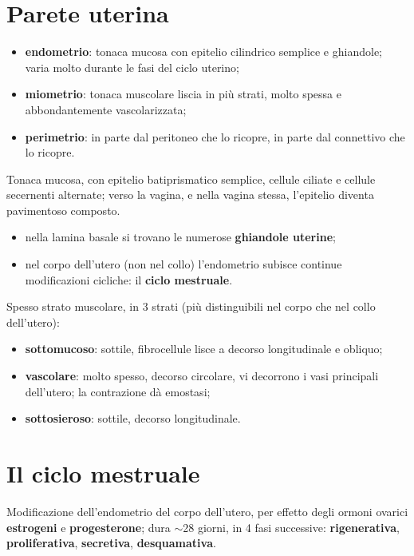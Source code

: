 \section{Parete uterina}

\begin{itemize}
  \item \textbf{endometrio}: tonaca mucosa con epitelio cilindrico semplice e ghiandole; varia
    molto durante le fasi del ciclo uterino;
  \item \textbf{miometrio}: tonaca muscolare liscia in più strati, molto spessa e abbondantemente
    vascolarizzata;
  \item \textbf{perimetrio}: in parte dal peritoneo che lo ricopre, in parte dal connettivo che lo
    ricopre.
\end{itemize}

Tonaca mucosa, con epitelio batiprismatico semplice, cellule ciliate e cellule secernenti
alternate; verso la vagina, e nella vagina stessa, l'epitelio diventa pavimentoso composto.
\begin{itemize}
  \item nella lamina basale si trovano le numerose \textbf{ghiandole uterine};
  \item nel corpo dell'utero (non nel collo) l'endometrio subisce continue modificazioni cicliche:
    il \textbf{ciclo mestruale}.
\end{itemize}

Spesso strato muscolare, in 3 strati (più distinguibili nel corpo che nel collo dell'utero):
\begin{itemize}
  \item \textbf{sottomucoso}: sottile, fibrocellule lisce a decorso longitudinale e obliquo;
  \item \textbf{vascolare}: molto spesso, decorso circolare, vi decorrono i vasi principali
    dell'utero; la contrazione dà emostasi;
  \item \textbf{sottosieroso}: sottile, decorso longitudinale.
\end{itemize}

\section{Il ciclo mestruale}

Modificazione dell'endometrio del corpo dell'utero, per effetto degli ormoni ovarici
\textbf{estrogeni} e \textbf{progesterone}; dura $\sim$28 giorni, in 4 fasi successive:
\textbf{rigenerativa}, \textbf{proliferativa}, \textbf{secretiva}, \textbf{desquamativa}.

